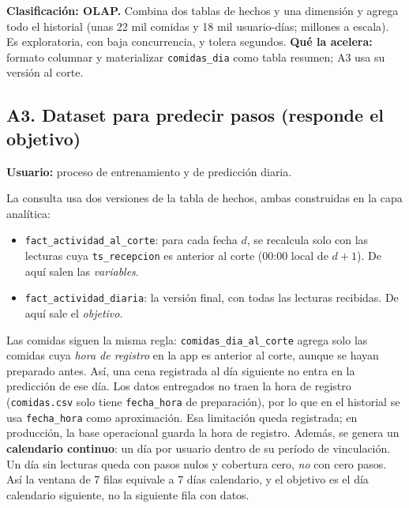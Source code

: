 \documentclass[11pt]{article}
\newcommand{\codigo}[1]{\texttt{\small #1}}
\begin{document}
\textbf{Clasificación: OLAP.} Combina dos tablas de hechos y una
dimensión y agrega todo el historial (unas 22 mil comidas y 18 mil
usuario-días; millones a escala). Es exploratoria, con baja
concurrencia, y tolera segundos. \textbf{Qué la acelera:} formato
columnar y materializar \codigo{comidas\_dia} como tabla resumen;
A3 usa su versión al corte.

\subsection{A3. Dataset para predecir pasos (responde el objetivo)}

\textbf{Usuario:} proceso de entrenamiento y de predicción diaria.

La consulta usa dos versiones de la tabla de hechos, ambas construidas
en la capa analítica:
\begin{itemize}
    \item \codigo{fact\_actividad\_al\_corte}: para cada fecha $d$, se
    recalcula solo con las lecturas cuya \codigo{ts\_recepcion} es
    anterior al corte (00:00 local de $d+1$). De aquí salen las
    \emph{variables}.
    \item \codigo{fact\_actividad\_diaria}: la versión final, con todas
    las lecturas recibidas. De aquí sale el \emph{objetivo}.
\end{itemize}
Las comidas siguen la misma regla: \codigo{comidas\_dia\_al\_corte}
agrega solo las comidas cuya \emph{hora de registro} en la app es
anterior al corte, aunque se hayan preparado antes. Así, una cena
registrada al día siguiente no entra en la predicción de ese día. Los
datos entregados no traen la hora de registro (\codigo{comidas.csv}
solo tiene \codigo{fecha\_hora} de preparación), por lo que en el
historial se usa \codigo{fecha\_hora} como aproximación. Esa
limitación queda registrada; en producción, la base operacional guarda
la hora de registro.
Además, se genera un \textbf{calendario continuo}: un día por usuario
dentro de su período de vinculación. Un día sin lecturas queda con
pasos nulos y cobertura cero, \emph{no} con cero pasos. Así la ventana
de 7 filas equivale a 7 días calendario, y el objetivo es el día
calendario siguiente, no la siguiente fila con datos.
\end{document}
